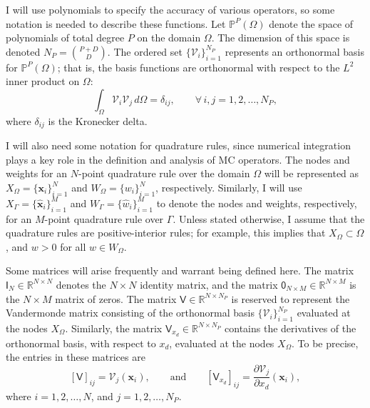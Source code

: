 \documentclass[pdflatex,sn-mathphys-num]{sn-jnl}%
\theoremstyle{thmstyleone}%
\theoremstyle{thmstyletwo}%
\theoremstyle{thmstylethree}%
\newcommand{\mat}[1]{\ensuremath{\mathsf{#1}}}
\newcommand{\fnc}[1]{\ensuremath{\mathcal{#1}}}
\begin{document}
I will use polynomials to specify the accuracy of various operators, so some notation is needed to describe these functions.  Let $\mathbb{P}^{P}(\Omega)$ denote the space of polynomials of total degree $P$ on the domain $\Omega$.  The dimension of this space is denoted $N_P = \binom{P+D}{D}$. The ordered set $\{ \fnc{V}_i \}_{i=1}^{N_P}$ represents an orthonormal basis for $\mathbb{P}^{P}(\Omega)$; that is, the basis functions are orthonormal with respect to the $L^2$ inner product on $\Omega$:
\begin{equation}\label{eq:ortho}
    \int_{\Omega} \fnc{V}_i \fnc{V}_j \,d\Omega = \delta_{ij},
    \qquad\forall\, i,j = 1, 2, \ldots, N_P,
\end{equation}
where $\delta_{ij}$ is the Kronecker delta.

I will also need some notation for quadrature rules, since numerical integration plays a key role in the definition and analysis of MC operators.  The nodes and weights for an $N$-point quadrature rule over the domain $\Omega$ will be represented as $X_{\Omega} = \{\bm{x}_i\}_{i=1}^{N}$ and $W_{\Omega} = \{ w_{i} \}_{i=1}^{N}$, respectively.  Similarly, I will use $X_{\Gamma} = \{\hat{\bm{x}}_i\}_{i=1}^{M}$ and $W_{\Gamma} = \{ \hat{w}_{i} \}_{i=1}^{M}$ to denote the nodes and weights, respectively, for an $M$-point quadrature rule over $\Gamma$.  Unless stated otherwise, I assume that the quadrature rules are positive-interior rules; for example, this implies that $X_{\Omega} \subset \Omega$, and $w > 0$ for all $w \in W_{\Omega}$.

Some matrices will arise frequently and warrant being defined here.  The matrix $\mat{I}_{N} \in \mathbb{R}^{N\times N}$ denotes the $N\times N$ identity matrix, and the matrix $\mat{0}_{N\times M} \in \mathbb{R}^{N \times M}$ is the $N \times M$ matrix of zeros.  The matrix $\mat{V} \in \mathbb{R}^{N \times N_P}$ is reserved to represent the Vandermonde matrix consisting of the orthonormal basis $\{ \fnc{V}_i \}_{i=1}^{N_P}$ evaluated at the nodes $X_{\Omega}$.  Similarly, the matrix $\mat{V}_{x_d} \in \mathbb{R}^{N \times N_P}$ contains the derivatives of the orthonormal basis, with respect to $x_d$, evaluated at the nodes $X_{\Omega}$.  To be precise, the entries in these matrices are 
\begin{equation}\label{eq:vandermonde}
    [\mat{V}]_{ij} = \fnc{V}_{j}(\bm{x}_i), \qquad 
    \text{and}\qquad 
    [\mat{V}_{x_d}]_{ij} = \frac{\partial \fnc{V}_{j}}{\partial x_d}(\bm{x}_i),
\end{equation}
where $i=1,2,\ldots,N$, and $j=1,2,\ldots,N_P$.
\end{document}

